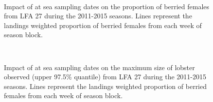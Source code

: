 \documentclass[11pt]{article}
\newcommand{\e}{/backup/bio_data/bio.lobster/figures/} %
\begin{document}
\begin{figure}
        \centering
         \\
                     \caption{Impact of at sea sampling dates on the proportion of berried females from LFA 27 during the 2011-2015 seasons. Lines represent the landings weighted proportion of berried females from each week of season block.}
        \end{figure}

\begin{figure}
        \centering
         \\
                     \caption{Impact of at sea sampling dates on the maximum size of lobster observed (upper 97.5\% quantile) from LFA 27 during the 2011-2015 seasons. Lines represent the landings weighted proportion of berried females from each week of season block.}
        \end{figure}
\end{document}
